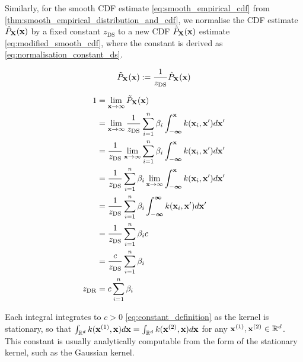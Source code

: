 \documentclass[twoside]{article} \usepackage{aistats2017}
\theoremstyle{definition}
\theoremstyle{theorem}
\newcommand{\rv}[1]{{#1}}
\begin{document}
		Similarly, for the smooth CDF estimate \eqref{eq:smooth_empirical_cdf} from \cref{thm:smooth_empirical_distribution_and_cdf}, we normalise the CDF estimate $\hat{P}_{\bvec{\rv{X}}}(\bvec{x})$ by a fixed constant $z_{\mathrm{DS}}$ to a new CDF $\tilde{P}_{\bvec{\rv{X}}}(\bvec{x})$ estimate \eqref{eq:modified_smooth_cdf}, where the constant is derived as \eqref{eq:normalisation_constant_ds}.
		
		\begin{equation}
			\tilde{P}_{\bvec{\rv{X}}}(\bvec{x}) := \frac{1}{z_{\mathrm{DS}}} \hat{P}_{\bvec{\rv{X}}}(\bvec{x})
		\label{eq:modified_smooth_cdf}
		\end{equation}
		
		\begin{equation}
			\begin{aligned}
				1 &= \lim_{\bvec{x} \to \infty} \tilde{P}_{\bvec{\rv{X}}}(\bvec{x}) \\
				&= \lim_{\bvec{x} \to \infty} \frac{1}{z_{\mathrm{DS}}} \sum_{i = 1}^{n} \beta_{i} \int_{-\bm{\infty}}^{\bvec{x}}  k(\bvec{x}_{i}, \bvec{x}') d\bvec{x}' \\
				&= \frac{1}{z_{\mathrm{DS}}} \lim_{\bvec{x} \to \infty} \sum_{i = 1}^{n} \beta_{i} \int_{-\bm{\infty}}^{\bvec{x}}  k(\bvec{x}_{i}, \bvec{x}') d\bvec{x}' \\
				&= \frac{1}{z_{\mathrm{DS}}} \sum_{i = 1}^{n} \beta_{i} \lim_{\bvec{x} \to \infty} \int_{-\bm{\infty}}^{\bvec{x}}  k(\bvec{x}_{i}, \bvec{x}') d\bvec{x}' \\
				&= \frac{1}{z_{\mathrm{DS}}} \sum_{i = 1}^{n} \beta_{i} \int_{-\bm{\infty}}^{\bm{\infty}}  k(\bvec{x}_{i}, \bvec{x}') d\bvec{x}' \\
				&= \frac{1}{z_{\mathrm{DS}}} \sum_{i = 1}^{n} \beta_{i} c \\
				&= \frac{c}{z_{\mathrm{DS}}} \sum_{i = 1}^{n} \beta_{i} \\
				z_{\mathrm{DR}} &= c \sum_{i = 1}^{n} \beta_{i}
			\end{aligned}
		\label{eq:normalisation_constant_ds}
		\end{equation}
		
		Each integral integrates to $c > 0$ \eqref{eq:constant_definition} as the kernel is stationary, so that $\int_{\mathbb{R}^{d}} k(\mathbf{x}^{(1)}, \mathbf{x}) d\mathbf{x} = \int_{\mathbb{R}^{d}} k(\mathbf{x}^{(2)}, \mathbf{x}) d\mathbf{x}$ for any $\mathbf{x}^{(1)}, \mathbf{x}^{(2)} \in \mathbb{R}^{d}$. This constant is usually analytically computable from the form of the stationary kernel, such as the Gaussian kernel.
		
\end{document}
